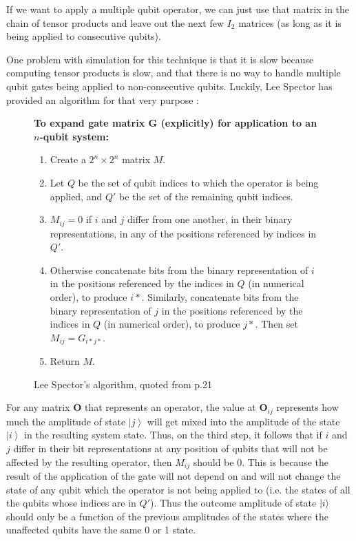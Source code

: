\documentclass[11pt]{report}
\newcommand{\?}{\stackrel{?}{=}}
\begin{document}
If we want to apply a multiple qubit operator, we can just use that matrix in the chain of tensor products and leave out the next few $I_2$ matrices (as long as it is being applied to consecutive qubits). 

One problem with simulation for this technique is that it is slow because computing tensor products is slow, and that there is no way to handle multiple qubit gates being applied to non-consecutive qubits. Luckily, Lee Spector has provided an algorithm for that very purpose \cite{spector04}:
\begin{figure}[H]
\begin{framed}
\textbf{To expand gate matrix G (explicitly) for application to an $n$-qubit system:}
\begin{enumerate}
\item Create a $2^{n} \times 2^{n}$ matrix $M$.
\item Let $Q$ be the set of qubit indices to which the operator is
being applied, and $Q'$ be the set of the remaining qubit
indices.
\item $M_{ij}=0$ if $i$ and $j$ differ from one another, in their binary representations, in any of the positions referenced by indices in $Q'$.
\item Otherwise concatenate bits from the binary representation of $i$ in the positions referenced by the indices in $Q$ (in numerical order), to produce $i*$. Similarly, concatenate bits from the binary representation of $j$ in the positions referenced by the indices in $Q$ (in numerical order), to
produce $j*$. Then set $M_{ij}=G_{i*j*}$.
\item Return $M$.
\end{enumerate}
\end{framed}
\caption{Lee Spector's algorithm, quoted from p.21}
\end{figure}

For any matrix $\mathbf{O}$ that represents an operator, the value at $\mathbf{O}_{ij}$ represents how much the amplitude of state $\left | j \right \rangle$ will get mixed into the amplitude of the state $\left | i \right \rangle$ in the resulting system state. Thus, on the third step, it follows that if $i$ and $j$ differ in their bit representations at any position of qubits that will not be affected by the resulting operator, then $M_{ij}$ should be 0. This is because the result of the application of the gate will not depend on and will not change the state of any qubit which the operator is not being applied to (i.e. the states of all the qubits whose indices are in $Q'$). Thus the outcome amplitude of state $\ket{i}$ should only be a function of the previous amplitudes of the states where the unaffected qubits have the same 0 or 1 state.
\end{document}
